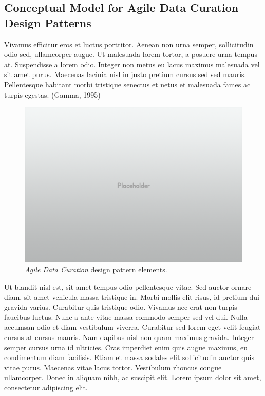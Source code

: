 \documentclass[final]{beamer}
\begin{document}
\begin{frame}[t]
\begin{multicols}{3}
\section{Conceptual Model for Agile Data Curation Design
Patterns}\label{conceptual-model-for-agile-data-curation-design-patterns}

Vivamus efficitur eros et luctus porttitor. Aenean non urna semper,
sollicitudin odio sed, ullamcorper augue. Ut malesuada lorem tortor, a
posuere urna tempus at. Suspendisse a lorem odio. Integer non metus eu
lacus maximus malesuada vel sit amet purus. Maecenas lacinia nisl in
justo pretium cursus sed sed mauris. Pellentesque habitant morbi
tristique senectus et netus et malesuada fames ac turpis egestas.
(Gamma, 1995)

\begin{figure}[htbp]
\centering
\includegraphics{placeholder.png}
\caption{\emph{Agile Data Curation} design pattern elements.}
\end{figure}

Ut blandit nisl est, sit amet tempus odio pellentesque vitae. Sed auctor
ornare diam, sit amet vehicula massa tristique in. Morbi mollis elit
risus, id pretium dui gravida varius. Curabitur quis tristique odio.
Vivamus nec erat non turpis faucibus luctus. Nunc a ante vitae massa
commodo semper sed vel dui. Nulla accumsan odio et diam vestibulum
viverra. Curabitur sed lorem eget velit feugiat cursus at cursus mauris.
Nam dapibus nisl non quam maximus gravida. Integer semper cursus urna id
ultricies. Cras imperdiet enim quis augue maximus, eu condimentum diam
facilisis. Etiam et massa sodales elit sollicitudin auctor quis vitae
purus. Maecenas vitae lacus tortor. Vestibulum rhoncus congue
ullamcorper. Donec in aliquam nibh, ac suscipit elit. Lorem ipsum dolor
sit amet, consectetur adipiscing elit.


\end{multicols}
\end{frame}
\end{document}
